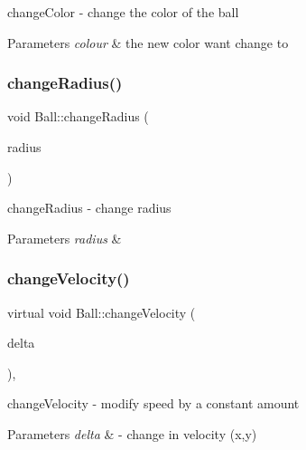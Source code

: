 change\+Color -\/ change the color of the ball 


\begin{DoxyParams}{Parameters}
{\em colour} & the new color want change to \\
\hline
\end{DoxyParams}
\mbox{\label{class_ball_a8e53255b6e2867060205bc037fcd6744}} 
\subsubsection{\texorpdfstring{change\+Radius()}{changeRadius()}}
{\footnotesize\ttfamily void Ball\+::change\+Radius (\begin{DoxyParamCaption}\item[{int}]{radius }\end{DoxyParamCaption})\hspace{0.3cm}{\ttfamily [inline]}}



change\+Radius -\/ change radius 


\begin{DoxyParams}{Parameters}
{\em radius} & \\
\hline
\end{DoxyParams}
\mbox{\label{class_ball_add51f90f60cb862daa8f3f7aa743f933}} 
\subsubsection{\texorpdfstring{change\+Velocity()}{changeVelocity()}}
{\footnotesize\ttfamily virtual void Ball\+::change\+Velocity (\begin{DoxyParamCaption}\item[{const Q\+Vector2D \&}]{delta }\end{DoxyParamCaption})\hspace{0.3cm}{\ttfamily [inline]}, {\ttfamily [virtual]}}



change\+Velocity -\/ modify speed by a constant amount 


\begin{DoxyParams}{Parameters}
{\em delta} & -\/ change in velocity (x,y) \\
\hline
\end{DoxyParams}


